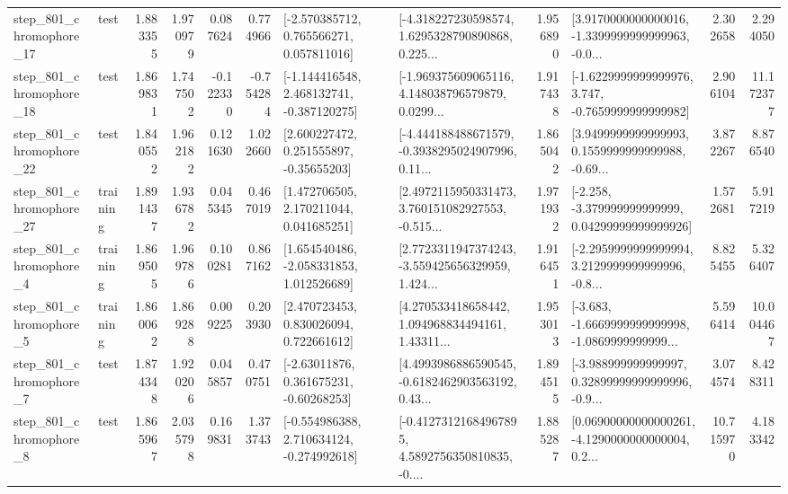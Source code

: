 \begin{tabular}{llrrrrllrlrr}
  step\_801\_chromophore\_17 &      test &      1.883355 &    1.970979 &      0.087624 &  0.774966 &    [-2.570385712, 0.765566271, 0.057811016] &  [-4.318227230598574, 1.6295328790890868, 0.225... &       1.956890 &  [3.9170000000000016, -1.3399999999999963, -0.0... &            2.302658 &          2.294050 \\
  step\_801\_chromophore\_18 &      test &      1.869831 &    1.747502 &     -0.122330 & -0.754284 &   [-1.144416548, 2.468132741, -0.387120275] &  [-1.969375609065116, 4.148038796579879, 0.0299... &       1.917438 &  [-1.6229999999999976, 3.747, -0.7659999999999982] &            2.906104 &         11.172377 \\
  step\_801\_chromophore\_22 &      test &      1.840552 &    1.962182 &      0.121630 &  1.022660 &     [2.600227472, 0.251555897, -0.35655203] &  [-4.444188488671579, -0.3938295024907996, 0.11... &       1.865042 &  [3.9499999999999993, 0.1559999999999988, -0.69... &            3.872267 &          8.876540 \\
  step\_801\_chromophore\_27 &  training &      1.891437 &    1.936782 &      0.045345 &  0.467019 &     [1.472706505, 2.170211044, 0.041685251] &  [2.4972115950331473, 3.760151082927553, -0.515... &       1.971932 &  [-2.258, -3.379999999999999, 0.04299999999999926] &            1.572681 &          5.917219 \\
   step\_801\_chromophore\_4 &  training &      1.869505 &    1.969786 &      0.100281 &  0.867162 &    [1.654540486, -2.058331853, 1.012526689] &  [2.7723311947374243, -3.559425656329959, 1.424... &       1.916451 &  [-2.2959999999999994, 3.2129999999999996, -0.8... &            8.825455 &          5.326407 \\
   step\_801\_chromophore\_5 &  training &      1.860062 &    1.869288 &      0.009225 &  0.203930 &     [2.470723453, 0.830026094, 0.722661612] &  [4.270533418658442, 1.094968834494161, 1.43311... &       1.953013 &  [-3.683, -1.6669999999999998, -1.0869999999999... &            5.596414 &         10.004467 \\
   step\_801\_chromophore\_7 &      test &      1.874348 &    1.920206 &      0.045857 &  0.470751 &     [-2.63011876, 0.361675231, -0.60268253] &  [4.4993986886590545, -0.6182462903563192, 0.43... &       1.894515 &  [-3.988999999999997, 0.32899999999999996, -0.9... &            3.074574 &          8.428311 \\
   step\_801\_chromophore\_8 &      test &      1.865967 &    2.035798 &      0.169831 &  1.373743 &   [-0.554986388, 2.710634124, -0.274992618] &  [-0.41273121684967895, 4.5892756350810835, -0.... &       1.885287 &  [0.06900000000000261, -4.1290000000000004, 0.2... &           10.715970 &          4.183342 \\

\end{tabular}
